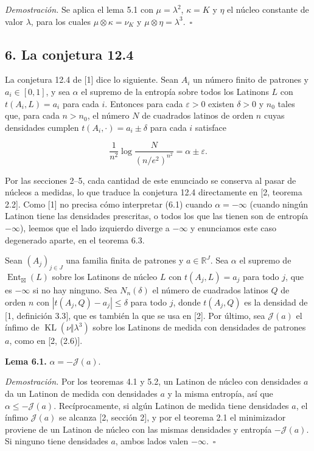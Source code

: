 \documentclass[spanish,11pt,a4paper]{article}
\begin{document}
\emph{Demostración.} Se aplica el lema 5.1 con \(\mu=\lambda^2\), \(\kappa=K\) y \(\eta\) el núcleo constante de valor \(\lambda\), para los cuales \(\mu\otimes\kappa=\nu_K\) y \(\mu\otimes\eta=\lambda^3\).~\(\square\)

\subsection{6. La conjetura 12.4}\label{la-conjetura-12.4}

La conjetura 12.4 de {[}1{]} dice lo siguiente. Sean \(A_i\) un número finito de patrones y \(a_i\in[0,1]\), y sea \(\alpha\) el supremo de la entropía sobre todos los Latinons \(L\) con \(t(A_i,L)=a_i\) para cada \(i\). Entonces para cada \(\varepsilon>0\) existen \(\delta>0\) y \(n_0\) tales que, para cada \(n>n_0\), el número \(N\) de cuadrados latinos de orden \(n\) cuyas densidades cumplen \(t(A_i,\cdot)=a_i\pm\delta\) para cada \(i\) satisface

\nopagebreak[4]
\[\frac1{n^2}\log\frac{N}{(n/e^2)^{n^2}}=\alpha\pm\varepsilon.\tag{6.1}\]

Por las secciones 2--5, cada cantidad de este enunciado se conserva al pasar de núcleos a medidas, lo que traduce la conjetura 12.4 directamente en {[}2, teorema 2.2{]}. Como {[}1{]} no precisa cómo interpretar (6.1) cuando \(\alpha=-\infty\) (cuando ningún Latinon tiene las densidades prescritas, o todos los que las tienen son de entropía \(-\infty\)), leemos que el lado izquierdo diverge a \(-\infty\) y enunciamos este caso degenerado aparte, en el teorema 6.3.

Sean \((A_j)_{j\in J}\) una familia finita de patrones y \(a\in\mathbb R^J\). Sea \(\alpha\) el supremo de \(\operatorname{Ent}_{\boxtimes}(L)\) sobre los Latinons de núcleo \(L\) con \(t(A_j,L)=a_j\) para todo \(j\), que es \(-\infty\) si no hay ninguno. Sea \(N_n(\delta)\) el número de cuadrados latinos \(Q\) de orden \(n\) con \(|t(A_j,Q)-a_j|\le\delta\) para todo \(j\), donde \(t(A_j,Q)\) es la densidad de {[}1, definición 3.3{]}, que es también la que se usa en {[}2{]}. Por último, sea \(\mathcal J(a)\) el ínfimo de \(\operatorname{KL}(\nu\Vert\lambda^3)\) sobre los Latinons de medida con densidades de patrones \(a\), como en {[}2, (2.6){]}.

\textbf{Lema 6.1.} \(\alpha=-\mathcal J(a)\).

\emph{Demostración.} Por los teoremas 4.1 y 5.2, un Latinon de núcleo con densidades \(a\) da un Latinon de medida con densidades \(a\) y la misma entropía, así que \(\alpha\le-\mathcal J(a)\). Recíprocamente, si algún Latinon de medida tiene densidades \(a\), el ínfimo \(\mathcal J(a)\) se alcanza {[}2, sección 2{]}, y por el teorema 2.1 el minimizador proviene de un Latinon de núcleo con las mismas densidades y entropía \(-\mathcal J(a)\). Si ninguno tiene densidades \(a\), ambos lados valen \(-\infty\).~\(\square\)
\end{document}
